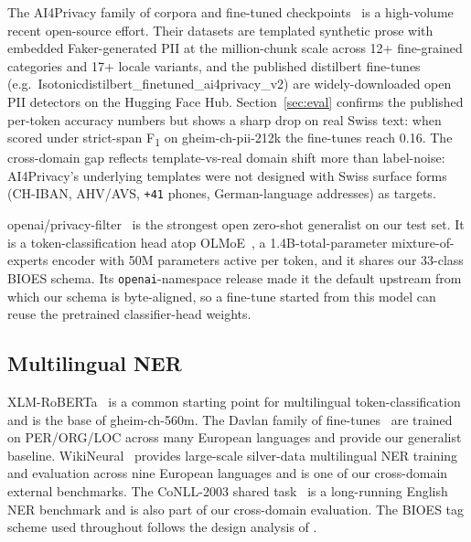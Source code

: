 \documentclass[sigconf,nonacm]{acmart}
\newcommand*{\Bsl}{\discretionary{/}{}{/}}%
\newcommand*{\Bhy}{\discretionary{-}{}{-}}%
\begin{document}
The AI4Privacy family of corpora and fine-tuned
checkpoints~\cite{ai4privacy2024openpii,ai4privacy2024pii200k} is a
high-volume recent open-source effort. Their datasets are templated
synthetic prose with embedded Faker-generated PII at the million-chunk
scale across 12+ fine-grained categories and 17+ locale variants,
and the published distilbert fine-tunes (e.g.\ \textsf{Isotonic\Bsl distil\Bhy bert\_\allowbreak finetuned\_\allowbreak ai4privacy\_\allowbreak v2})
are widely-downloaded open PII detectors on the Hugging Face Hub.
Section~\ref{sec:eval} confirms the published per-token accuracy
numbers but shows a sharp drop on real Swiss text: when scored under
strict-span F\textsubscript{1} on \textsf{gheim-ch-pii-212k} the
fine-tunes reach 0.16. The cross-domain gap reflects template-vs-real
domain shift more than label-noise: AI4Privacy's underlying templates
were not designed with Swiss surface forms (CH-IBAN, AHV/AVS,
\texttt{+41} phones, German-language addresses) as targets.

\textsf{openai/privacy-filter}~\cite{openai2025privacyfilter} is the
strongest open zero-shot generalist on our test set. It is a
token-classification head atop OLMoE~\cite{muennighoff2024olmoe},
a 1.4B-total-parameter mixture-of-experts encoder with 50M parameters
active per token, and it shares our 33-class BIOES schema. Its
\texttt{openai}-namespace release made it the default upstream from
which our schema is byte-aligned, so a fine-tune started from this
model can reuse the pretrained classifier-head weights.

\subsection{Multilingual NER}

\textsf{XLM-RoBERTa}~\cite{conneau2020unsupervised} is a common
starting point for multilingual token-classification and is the base
of \textsf{gheim-ch-560m}. The Davlan family of
fine-tunes~\cite{davlan2022xlmrnerhrl} are trained on PER/ORG/LOC
across many European languages and provide our generalist baseline.
WikiNeural~\cite{tedeschi2021wikineural} provides large-scale
silver-data multilingual NER training and evaluation across nine
European languages and is one of our cross-domain external
benchmarks. The CoNLL-2003 shared
task~\cite{tjong2003introduction} is a long-running English NER
benchmark and is also part of our cross-domain evaluation. The BIOES
tag scheme used throughout follows the design analysis of
\citet{ratinov2009design}.
\end{document}
